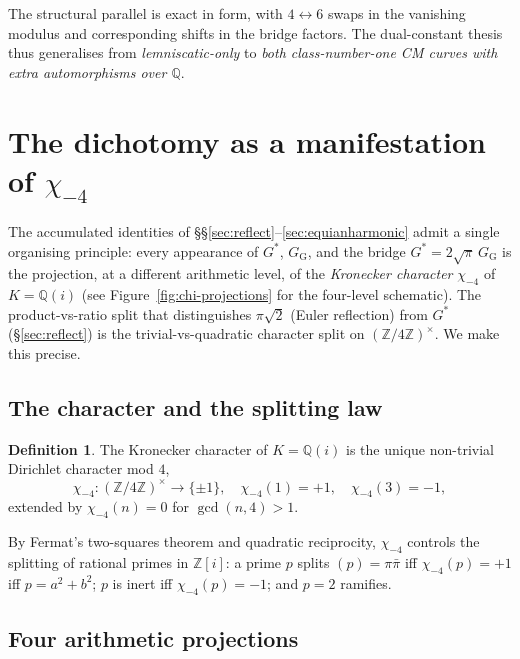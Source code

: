 \documentclass[11pt]{article}
\theoremstyle{definition}
\newtheorem{definition}[theorem]{Definition}
\theoremstyle{remark}
\newcommand{\Gs}{G^{*}}
\newcommand{\GG}{G_{\!\scriptscriptstyle\mathrm{G}}}
\newcommand{\Z}{\mathbb{Z}}
\newcommand{\Q}{\mathbb{Q}}
\begin{document}
The structural parallel is exact in form, with $4 \leftrightarrow 6$
swaps in the vanishing modulus and corresponding shifts in the bridge
factors. The dual-constant thesis thus generalises from
\emph{lemniscatic-only} to \emph{both class-number-one CM curves with
extra automorphisms over $\Q$}.

\section{The dichotomy as a manifestation of $\chi_{-4}$}\label{sec:character}

The accumulated identities of \S\S\ref{sec:reflect}--\ref{sec:equianharmonic}
admit a single organising principle: every appearance of $\Gs$, $\GG$, and
the bridge $\Gs = 2\sqrt\pi\,\GG$ is the projection, at a different
arithmetic level, of the \emph{Kronecker character} $\chi_{-4}$ of
$K = \Q(i)$ (see Figure~\ref{fig:chi-projections} for the four-level
schematic). The product-vs-ratio split that distinguishes $\pi\sqrt 2$
(Euler reflection) from $\Gs$ (\S\ref{sec:reflect}) is the
trivial-vs-quadratic character split on $(\Z/4\Z)^\times$. We make this
precise.

\subsection{The character and the splitting law}

\begin{definition}\label{def:chi-minus-four}
The Kronecker character of $K = \Q(i)$ is the unique non-trivial Dirichlet
character mod $4$,
\[
\chi_{-4}: (\Z/4\Z)^\times \to \{\pm 1\}, \quad
\chi_{-4}(1) = +1, \quad \chi_{-4}(3) = -1,
\]
extended by $\chi_{-4}(n) = 0$ for $\gcd(n, 4) > 1$.
\end{definition}

By Fermat's two-squares theorem and quadratic reciprocity, $\chi_{-4}$
controls the splitting of rational primes in $\Z[i]$: a prime $p$ splits
$(p) = \pi\bar\pi$ iff $\chi_{-4}(p) = +1$ iff $p = a^2 + b^2$; $p$ is
inert iff $\chi_{-4}(p) = -1$; and $p = 2$ ramifies.

\subsection{Four arithmetic projections}
\end{document}
